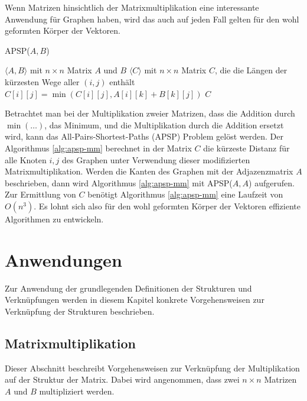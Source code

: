 \documentclass[oneside]{scrbook}
\numberwithin{equation}{section}
\begin{document}
Wenn Matrizen hinsichtlich der Matrixmultiplikation eine interessante Anwendung für Graphen haben, wird das auch auf jeden Fall gelten für den wohl geformten Körper der Vektoren.
\begin{algorithm}
	\caption{APSP($A, B$)}
	\label{alg:apsp-mm}
	\begin{algorithmic}[1]
		\Require $\langle A, B\rangle$ mit $n \times n$ Matrix $A$ und $B$
		\Ensure $\langle C\rangle$ mit $n \times n$ Matrix $C$, die die Längen der kürzesten Wege aller $(i, j)$ enthält
		\State $C[i][j] = \min(C[i][j], A[i][k] + B[k][j])$
		\EndIf
		\EndFor
		\EndFor
		\EndFor
		\State \Return $C$
	\end{algorithmic}
\end{algorithm}
Betrachtet man bei der Multiplikation zweier Matrizen, dass die Addition durch $\min(\ldots)$, das Minimum, und die Multiplikation durch die Addition ersetzt wird, kann das All-Pairs-Shortest-Paths (APSP) Problem gelöst werden. Der Algorithmus \ref{alg:apsp-mm} berechnet in der Matrix $C$ die kürzeste Distanz für alle Knoten $i, j$ des Graphen unter Verwendung dieser modifizierten Matrixmultiplikation. Werden die Kanten des Graphen mit der Adjazenzmatrix $A$ beschrieben, dann wird Algorithmus \ref{alg:apsp-mm} mit APSP($A, A$) aufgerufen. Zur Ermittlung von $C$ benötigt Algorithmus \ref{alg:apsp-mm} eine Laufzeit von $O(n^3)$. Es lohnt sich also für den wohl geformten Körper der Vektoren effiziente Algorithmen zu entwickeln.

\chapter{Anwendungen}
\label{chap:anwendungen}
Zur Anwendung der grundlegenden Definitionen der Strukturen und Verknüpfungen werden in diesem Kapitel konkrete Vorgehensweisen zur Verknüpfung der Strukturen beschrieben.

\section{Matrixmultiplikation}
Dieser Abschnitt beschreibt Vorgehensweisen zur Verknüpfung der Multiplikation auf der Struktur der Matrix. Dabei wird angenommen, dass zwei $n \times n$ Matrizen $A$ und $B$ multipliziert werden.
\end{document}
